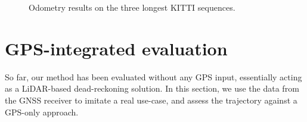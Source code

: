 \begin{figure}[h]
    \centering
    \caption[Odometry evaluation on KITTI sequences]{Odometry results on the three longest KITTI sequences.}
    \label{fig:kitti-traj}
\end{figure}

\section{GPS-integrated evaluation}

So far, our method has been evaluated without any GPS input, essentially acting as a LiDAR-based dead-reckoning solution. In this section, we use the data from the GNSS receiver to imitate a real use-case, and assess the trajectory against a GPS-only approach.

